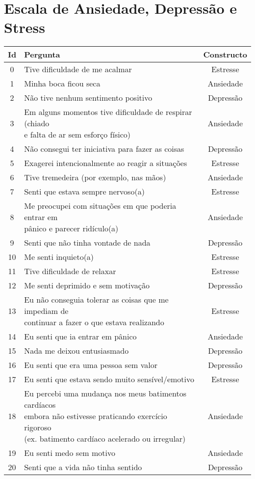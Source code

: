 \chapter{Escala de Ansiedade, Depressão e Stress}
\label{app:eads}

\begin{table}[h]
\resizebox{15cm}{!} {
    \begin{tabular}{|c|l|c|}
    \hline
    \textbf{Id} & \textbf{Pergunta} & \textbf{Constructo} \\ \hline
    0 & Tive dificuldade de me acalmar & Estresse \\ \hline
    1 & Minha boca ficou seca & Ansiedade \\ \hline
    2 & Não tive nenhum sentimento positivo & Depressão \\ \hline
    3 & \specialcell{Em alguns momentos tive dificuldade de respirar (chiado\\e falta de ar sem esforço físico)} & Ansiedade \\ \hline
    4 & Não consegui ter iniciativa para fazer as coisas & Depressão \\ \hline
    5 & Exagerei intencionalmente ao reagir a situações & Estresse \\ \hline
    6 & Tive tremedeira (por exemplo, nas mãos) & Ansiedade \\ \hline
    7 & Senti que estava sempre nervoso(a) & Estresse \\ \hline
    8 & \specialcell{Me preocupei com situações em que poderia entrar em\\pânico e parecer ridículo(a)} & Ansiedade \\ \hline
    9 & Senti que não tinha vontade de nada & Depressão \\ \hline
    10 & Me senti inquieto(a) & Estresse \\ \hline
    11 & Tive dificuldade de relaxar & Estresse \\ \hline
    12 & Me senti deprimido e sem motivação & Depressão \\ \hline
    13 & \specialcell{Eu não conseguia tolerar as coisas que me impediam de\\continuar a fazer o que estava realizando} & Estresse \\ \hline
    14 & Eu senti que ia entrar em pânico & Ansiedade \\ \hline
    15 & Nada me deixou entusiasmado & Depressão \\ \hline
    16 & Eu senti que era uma pessoa sem valor & Depressão \\ \hline
    17 & Eu senti que estava sendo muito sensível/emotivo & Estresse \\ \hline
    18 & \specialcell{Eu percebi uma mudança nos meus batimentos cardíacos\\embora não estivesse praticando exercício rigoroso\\(ex. batimento cardíaco acelerado ou irregular)} & Ansiedade \\ \hline
    19 & Eu senti medo sem motivo & Ansiedade \\ \hline
    20 & Senti que a vida não tinha sentido & Depressão \\ \hline
    \end{tabular}
}
\end{table}